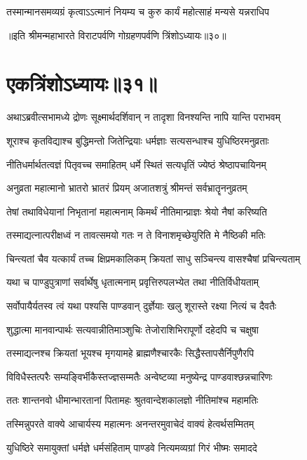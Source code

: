\twolineshloka
{तस्मान्मानसमव्यग्रं कृत्वाऽऽत्मानं नियम्य च}
{कुरु कार्यं महोत्साहं मन्यसे यन्नराधिप}

॥इति श्रीमन्महाभारते विराटपर्वणि गोग्रहणपर्वणि त्रिंशोऽध्यायः॥३०॥

\chapter{एकत्रिंशोऽध्यायः॥३१॥}

\twolineshloka
{अथाऽब्रवीत्सभामध्ये द्रोणः सूक्ष्मार्थदर्शिवान्}
{न तादृशा विनश्यन्ति नापि यान्ति पराभवम्}


\twolineshloka
{शूराश्च कृतविद्याश्च बुद्धिमन्तो जितेन्द्रियाः}
{धर्मज्ञाः सत्यसन्धाश्च युधिष्ठिरमनुव्रताः}


\twolineshloka
{नीतिधर्मार्थतत्वज्ञं पितृवच्च समाहितम्}
{धर्मे स्थितं सत्यधृतिं ज्येष्ठं श्रेष्ठापचायिनम्}


\twolineshloka
{अनुव्रता महात्मानो भ्रातरो भ्रातरं प्रियम्}
{अजातशत्रुं श्रीमन्तं सर्वभ्रातॄननुव्रतम्}


\twolineshloka
{तेषां तथाविधेयानां निभृतानां महात्मनाम्}
{किमर्थं नीतिमान्प्राज्ञः श्रेयो नैषां करिष्यति}


\twolineshloka
{तस्माद्यत्नात्परीक्षध्वं न तावत्समयो गतः}
{न ते विनाशमृच्छेयुरिति मे नैष्ठिकी मतिः}


\twolineshloka
{चिन्त्यतां चैव यत्कार्यं तच्च क्षिप्रमकालिकम्}
{क्रियतां साधु सञ्चिन्त्य वासश्चैषां प्रचिन्त्यताम्}


\twolineshloka
{यथा च पाण्डुपुत्राणां सर्वार्थेषु धृतात्मनाम्}
{प्रवृत्तिरुपलभ्येत तथा नीतिर्विधीयताम्}


\twolineshloka
{सर्वोपायैर्यतस्व त्वं यथा पश्यसि पाण्डवान्}
{दुर्ज्ञेयाः खलु शूरास्ते रक्ष्या नित्यं च दैवतैः}


\twolineshloka
{शुद्धात्मा मानवान्पार्थः सत्यवान्नीतिमाञ्शुचिः}
{तेजोराशिभिरापूर्णो दहेदपि च चक्षुषा}


\twolineshloka
{तस्माद्यत्नश्च क्रियतां भूयश्च मृगयामहे}
{ब्राह्मणैश्चारकैः सिद्धैस्तापसैर्निपुणैरपि}


\twolineshloka
{विविधैस्तत्परैः सम्यङ्विर्भीकैस्तज्ज्ञसम्मतैः}
{अन्वेष्टव्या मनुष्येन्द्र पाण्डवाश्छन्नचारिणः}


\twolineshloka
{ततः शान्तनवो धीमान्भारतानां पितामहः}
{श्रुतवान्देशकालज्ञो नीतिमांश्च महामतिः}


\twolineshloka
{तस्मिन्नुपरते वाक्ये आचार्यस्य महात्मनः}
{अनन्तरमुवाचेदं वाक्यं हेत्वर्थसम्मितम्}


\twolineshloka
{युधिष्ठिरे समायुक्तां धर्मज्ञे धर्मसंहिताम्}
{पाण्डवे नित्यमव्यग्रां गिरं भीष्मः समाददे}


